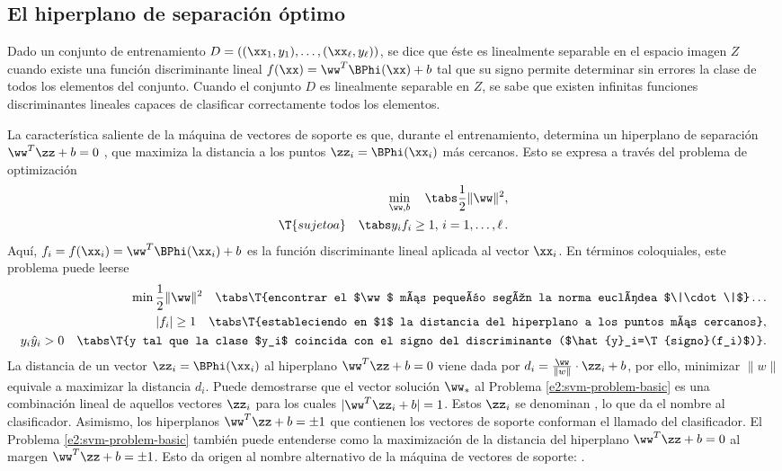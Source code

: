 %
%
\subsection{El hiperplano de separación óptimo}
%
Dado un conjunto de entrenamiento
$D=\left((\xx_1,y_1),\ldots,(\xx_\ell,y_\ell)\right)$, se dice que
éste es linealmente separable en el espacio imagen $Z$ cuando existe
una función discriminante lineal $f(\xx)=\ww^T\BPhi(\xx)+b$ tal que su
signo permite determinar sin errores la clase de todos los elementos
del conjunto. Cuando el conjunto $D$ es linealmente separable en $Z$,
se sabe que existen infinitas funciones discriminantes lineales
capaces de clasificar correctamente todos los elementos.

La característica saliente de la máquina de vectores de soporte es
que, durante el entrenamiento, determina un hiperplano de separación
$\ww^T\zz+b=0$ , que maximiza la distancia a los puntos
$\zz_i=\BPhi(\xx_i)$ más cercanos. Esto se expresa a través del
problema de optimización
%
\begin{align}
  \begin{split}
    \min_{\ww,b} \quad\tabs \frac{1}{2}\|\ww\|^2, \\
    \T{sujeto a}\quad\tabs y_i f_i\geq1,\,i=1,\ldots,\ell\,.
  \end{split}
  \label{e2:svm-problem-basic}
\end{align}
%
Aquí, $f_i=f(\xx_i)=\ww^T\BPhi(\xx_i)+b$ es la función discriminante
lineal aplicada al vector $\xx_i$. En términos coloquiales, este
problema puede leerse
%
\begin{align*}
  \begin{split}
    \min \frac{1}{2}\|\ww\|^2 \quad \tabs \T{encontrar el $\ww$ más
      pequeño según la norma euclídea $\|\cdot\|$}\ldots\\
    |f_i|\geq1 \quad \tabs \T{estableciendo en $1$ la distancia del
      hiperplano a los puntos más cercanos},\\
    y_i\hat{y}_i>0\quad \tabs \T{y tal que la clase $y_i$ coincida con el
      signo del discriminante ($\hat{y}_i=\T{signo}(f_i)$)}.
  \end{split}
\end{align*}
%
La distancia de un vector $\zz_i=\BPhi(\xx_i)$ al hiperplano
$\ww^T\zz+b=0$ viene dada por $d_i=\frac{\ww}{\|w\|}\cdot\zz_i+b$, por
ello, minimizar $\|w\|$ equivale a maximizar la distancia $d_i$.
Puede demostrarse que el vector solución $\ww_*$ al Problema
\ref{e2:svm-problem-basic} es una combinación lineal de aquellos
vectores $\zz_i$ para los cuales $|\ww^T\zz_i+b|=1$. Estos $\zz_i$ se
denominan , lo que da el nombre al
clasificador.  Asimismo, los hiperplanos $\ww^T\zz+b=\pm1$ que
contienen los vectores de soporte conforman el llamado  del
clasificador. El Problema \ref{e2:svm-problem-basic} también puede
entenderse como la maximización de la distancia del hiperplano
$\ww^T\zz+b=0$ al margen $\ww^T\zz+b=\pm1$. Esto da origen al nombre
alternativo de la máquina de vectores de soporte: .

